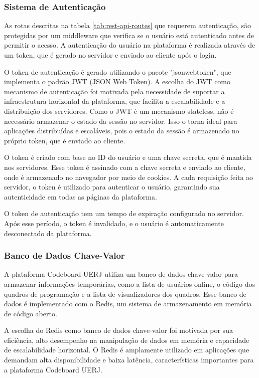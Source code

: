 \subsubsection{Sistema de Autenticação}

As rotas descritas na tabela \ref{tab:rest-api-routes} que requerem autenticação, são protegidas por um middleware que verifica se o usuário está autenticado antes de permitir o acesso. A autenticação do usuário na plataforma é realizada através de um token, que é gerado no servidor e enviado ao cliente após o login. 

O token de autenticação é gerado utilizando o pacote "jsonwebtoken", que implementa o padrão JWT (JSON Web Token). A escolha do JWT como mecanismo de autenticação foi motivada pela necessidade de suportar a infraestrutura horizontal da plataforma, que facilita a escalabilidade e a distribuição dos servidores. Como o JWT é um mecanismo stateless, não é necessário armazenar o estado da sessão no servidor. Isso o torna ideal para aplicações distribuídas e escaláveis, pois o estado da sessão é armazenado no próprio token, que é enviado ao cliente.

O token é criado com base no ID do usuário e uma chave secreta, que é mantida nos servidores. Esse token é assinado com a chave secreta e enviado ao cliente, onde é armazenado no navegador por meio de cookies. A cada requisição feita ao servidor, o token é utilizado para autenticar o usuário, garantindo sua autenticidade em todas as páginas da plataforma.

O token de autenticação tem um tempo de expiração configurado no servidor. Após esse período, o token é invalidado, e o usuário é automaticamente desconectado da plataforma.

\subsubsection{Banco de Dados Chave-Valor}

A plataforma Codeboard UERJ utiliza um banco de dados chave-valor para armazenar informações temporárias, como a lista de usuários online, o código dos quadros de programação e a lista de visualizadores dos quadros. Esse banco de dados é implementado com o Redis, um sistema de armazenamento em memória de código aberto.

A escolha do Redis como banco de dados chave-valor foi motivada por sua eficiência, alto desempenho na manipulação de dados em memória e capacidade de escalabilidade horizontal. O Redis é amplamente utilizado em aplicações que demandam alta disponibilidade e baixa latência, características importantes para a plataforma Codeboard UERJ.


